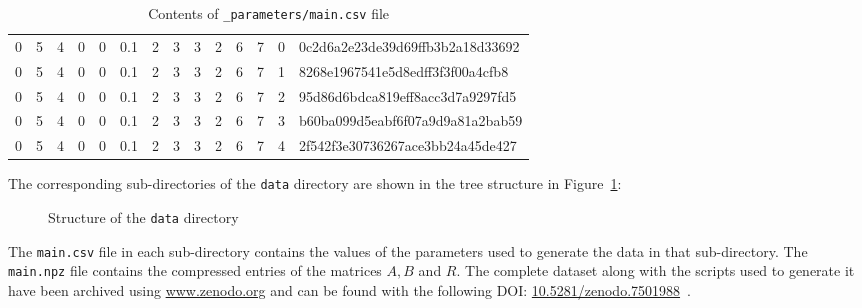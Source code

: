 \begin{table}[H]
    \centering
    \footnotesize
    \caption{Contents of \texttt{\_parameters/main.csv} file}
    \begin{tabular}{|cccccccccccccl|}
        \hline
        0 & 5 & 4 & 0 & 0 & 0.1 & 2 & 3 & 3 & 2 & 6 & 7 & 0 &
        0c2d6a2e23de39d69ffb3b2a18d33692 \\
        0 & 5 & 4 & 0 & 0 & 0.1 & 2 & 3 & 3 & 2 & 6 & 7 & 1 &
        8268e1967541e5d8edff3f3f00a4cfb8 \\
        0 & 5 & 4 & 0 & 0 & 0.1 & 2 & 3 & 3 & 2 & 6 & 7 & 2 &
        95d86d6bdca819eff8acc3d7a9297fd5 \\
        0 & 5 & 4 & 0 & 0 & 0.1 & 2 & 3 & 3 & 2 & 6 & 7 & 3 &
        b60ba099d5eabf6f07a9d9a81a2bab59 \\
        0 & 5 & 4 & 0 & 0 & 0.1 & 2 & 3 & 3 & 2 & 6 & 7 & 4 &
        2f542f3e30736267ace3bb24a45de427 \\
        \hline
    \end{tabular}
    \label{tab:parameters_csv}
\end{table}

The corresponding sub-directories of the \texttt{data}
directory are shown in the tree structure in Figure~\ref{fig:data_directory}:

\begin{figure}[H]
    \caption{Structure of the \texttt{data} directory}
    \label{fig:data_directory}
\end{figure}
    
The \texttt{main.csv} file in each sub-directory contains the values of the
parameters used to generate the data in that sub-directory.
The \texttt{main.npz} file contains the compressed entries of the matrices
\(A, B\) and \(R\).
The complete dataset along with the scripts used to generate it have been
archived using \url{www.zenodo.org} and can be found with the following DOI:
\url{10.5281/zenodo.7501988}~\cite{michalis_panayides_2023_7555285}.
